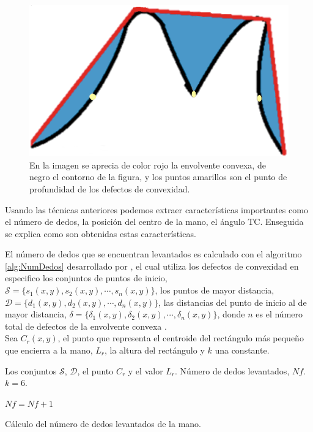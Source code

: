 \begin{figure}[h!]
\begin{center}
\includegraphics[scale=.4]{./Figures/ConvexHullAndDefects.png}
\end{center}
\caption{En la imagen se aprecia de color rojo la envolvente convexa, de negro el contorno de la figura, y los puntos amarillos son el punto de profundidad de los defectos de convexidad.}
\label{fig:FigConvexHullDefects}
\end{figure}  

Usando las técnicas anteriores podemos extraer características importantes como el número de dedos, la posición del centro de la mano, el ángulo TC. Enseguida se explica como son obtenidas estas características. 

El número de dedos que se encuentran levantados es calculado con el algoritmo \ref{alg:NumDedos} desarrollado por \citep{Kathuria2011}, el cual utiliza los defectos de convexidad en especifico los conjuntos de puntos de inicio, $\mathcal{S}=\lbrace s_1(x,y), s_2(x,y), \cdots, s_n(x,y) \rbrace$, los puntos de mayor distancia, $\mathcal{D}=\lbrace d_1(x,y), d_2(x,y), \cdots, d_n(x,y) \rbrace$, las distancias del punto de inicio al de mayor distancia, $\mathcal{\delta}=\lbrace \delta_1(x,y), \delta_2(x,y), \cdots, \delta_n(x,y) \rbrace$, donde $n$ es el número total de defectos de la envolvente convexa .\\
Sea $C_r(x,y)$, el punto que representa el centroide del rectángulo más pequeño que encierra a la mano, $L_r$, la altura del rectángulo y $k$ una constante. 

\begin{algorithm}[h!]
\begin{algorithmic}[1]
\REQUIRE Los conjuntos $\mathcal{S}$, $\mathcal{D}$, el punto $C_r$ y el valor $L_r$.   
\ENSURE Número de dedos levantados, $Nf$.  
	\STATE $k=6$. 	
	
	\STATE $Nf=Nf+1$
	\ENDIF 
\ENDFOR 

\caption{Cálculo del número de dedos levantados de la mano.}
\label{alg:NumDedos} 
\end{algorithmic}
\end{algorithm} 

